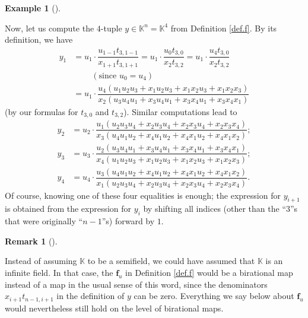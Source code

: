 \documentclass[numbers=enddot,12pt,final,onecolumn,notitlepage]{scrartcl}%
\theoremstyle{definition}
\newtheorem{remk}[theo]{Remark}
\newenvironment{remark}[1][]
{\begin{remk}[#1]\begin{leftbar}}
{\end{leftbar}\end{remk}}
\newtheorem{exam}[theo]{Example}
\newenvironment{example}[1][]
{\begin{exam}[#1]\begin{leftbar}}
{\end{leftbar}\end{exam}}
\begin{document}
\begin{example}
Now, let us compute the $4$-tuple $y\in\mathbb{K}^{n}=\mathbb{K}^{4}$ from
Definition \ref{def.f}. By its definition, we have%
\begin{align*}
y_{1}  &  =u_{1}\cdot\dfrac{u_{1-1}t_{3,1-1}}{x_{1+1}t_{3,1+1}}=u_{1}%
\cdot\dfrac{u_{0}t_{3,0}}{x_{2}t_{3,2}}=u_{1}\cdot\dfrac{u_{4}t_{3,0}}%
{x_{2}t_{3,2}}\\
&  \ \ \ \ \ \ \ \ \ \ \left(  \text{since }u_{0}=u_{4}\right) \\
&  =u_{1}\cdot\dfrac{u_{4}\left(  u_{1}u_{2}u_{3}+x_{1}u_{2}u_{3}+x_{1}%
x_{2}u_{3}+x_{1}x_{2}x_{3}\right)  }{x_{2}\left(  u_{3}u_{4}u_{1}+x_{3}%
u_{4}u_{1}+x_{3}x_{4}u_{1}+x_{3}x_{4}x_{1}\right)  }%
\end{align*}
(by our formulas for $t_{3,0}$ and $t_{3,2}$). Similar computations lead to%
\begin{align*}
y_{2}  &  =u_{2}\cdot\dfrac{u_{1}\left(  u_{2}u_{3}u_{4}+x_{2}u_{3}u_{4}%
+x_{2}x_{3}u_{4}+x_{2}x_{3}x_{4}\right)  }{x_{3}\left(  u_{4}u_{1}u_{2}%
+x_{4}u_{1}u_{2}+x_{4}x_{1}u_{2}+x_{4}x_{1}x_{2}\right)  };\\
y_{3}  &  =u_{3}\cdot\dfrac{u_{2}\left(  u_{3}u_{4}u_{1}+x_{3}u_{4}u_{1}%
+x_{3}x_{4}u_{1}+x_{3}x_{4}x_{1}\right)  }{x_{4}\left(  u_{1}u_{2}u_{3}%
+x_{1}u_{2}u_{3}+x_{1}x_{2}u_{3}+x_{1}x_{2}x_{3}\right)  };\\
y_{4}  &  =u_{4}\cdot\dfrac{u_{3}\left(  u_{4}u_{1}u_{2}+x_{4}u_{1}u_{2}%
+x_{4}x_{1}u_{2}+x_{4}x_{1}x_{2}\right)  }{x_{1}\left(  u_{2}u_{3}u_{4}%
+x_{2}u_{3}u_{4}+x_{2}x_{3}u_{4}+x_{2}x_{3}x_{4}\right)  }.
\end{align*}
Of course, knowing one of these four equalities is enough; the expression for
$y_{i+1}$ is obtained from the expression for $y_{i}$ by shifting all indices
(other than the \textquotedblleft$3$\textquotedblright s that were originally
\textquotedblleft$n-1$\textquotedblright s) forward by $1$.
\end{example}

\begin{remark}
Instead of assuming $\mathbb{K}$ to be a semifield, we could have assumed that
$\mathbb{K}$ is an infinite field. In that case, the $\mathbf{f}_{u}$ in
Definition \ref{def.f} would be a birational map instead of a map in the usual
sense of this word, since the denominators $x_{i+1}t_{n-1,i+1}$ in the
definition of $y$ can be zero. Everything we say below about $\mathbf{f}_{u}$
would nevertheless still hold on the level of birational maps.
\end{remark}
\end{document}
